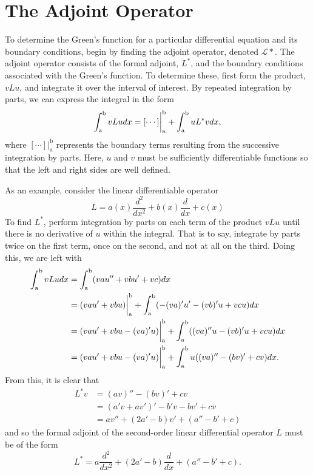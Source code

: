 \section{The Adjoint Operator}
To determine the Green's function for a particular differential equation and its boundary conditions, begin by finding the adjoint operator, denoted \(\mathcal{L*}\). The adjoint operator consists of the formal adjoint, \(L^*\), and the boundary conditions associated with the Green's function. To determine these, first form the product, \(vLu\), and integrate it over the interval of interest. By repeated integration by parts, we can express the integral in the form
\begin{equation} \label{eq:adjoint}
	\int_\mathrm{a}^\mathrm{b} vLu dx = [\cdots]\biggr\rvert_\mathrm{a}^\mathrm{b} + \int_\mathrm{a}^\mathrm{b} uL^*v dx,
\end{equation}
where \([\cdots]\biggr\rvert_\mathrm{a}^\mathrm{b}\) represents the boundary terms resulting from the successive integration by parts. Here, \(u\) and \(v\) must be sufficiently differentiable functions so that the left and right sides are well defined. 

As an example, consider the linear differentiable operator
\begin{equation}
	L= a(x) \frac{d^2}{dx^2} + b(x)\frac{d}{dx} + c(x)
\end{equation}
To find \(L^*\), perform integration by parts on each term of the product \(vLu\) until there is no derivative of \(u\) within the integral. That is to say, integrate by parts twice on the first term, once on the second, and not at all on the third. Doing this, we are left with
\begin{equation}
	\begin{split}
		\int_\mathrm{a}^\mathrm{b} vLu dx &= \int_\mathrm{a}^\mathrm{b} (vau''+ vbu' + vc)dx\\
		&=(vau'+vbu)\biggr\rvert_\mathrm{a}^\mathrm{b} + \int_\mathrm{a}^\mathrm{b} (-(va)'u'-(vb)'u+vcu)dx\\
		&=(vau'+vbu-(va)'u)\biggr\rvert_\mathrm{a}^\mathrm{b} + \int_\mathrm{a}^\mathrm{b} ((va)''u-(vb)'u+vcu)dx\\
		&=(vau'+vbu-(va)'u)\biggr\rvert_\mathrm{a}^\mathrm{b} + \int_\mathrm{a}^\mathrm{b} u((va)''-(bv)'+cv)dx.
	\end{split}
\end{equation}
From this, it is clear that 
\begin{equation}
	\begin{split}
		L^*v &= (av)''-(bv)'+cv\\
		     &= (a'v+av')'-b'v-bv'+cv\\
		     &= av''+(2a'-b)v'+(a''-b'+c)
	\end{split}
\end{equation}
and so the formal adjoint of the second-order linear differential operator \(L\) must be of the form
\begin{equation}
	L^*=a\frac{d^2}{dx^2} + (2a'-b)\frac{d}{dx}+(a''-b'+c).
\end{equation}


